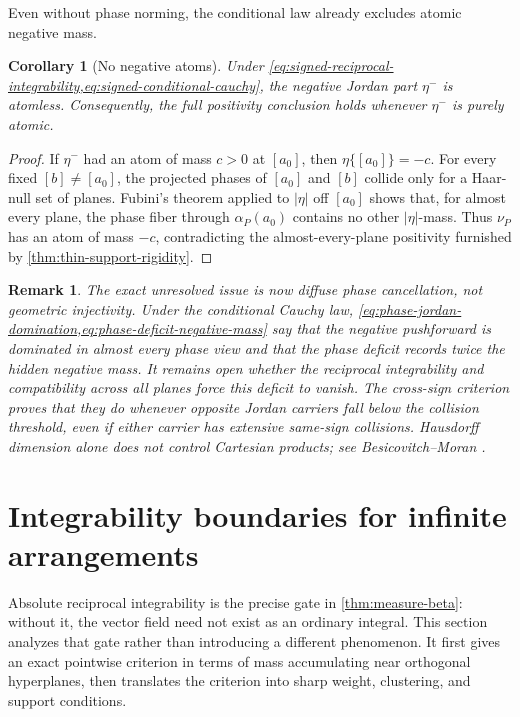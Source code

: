 \documentclass[11pt]{article}
\numberwithin{equation}{section}
\theoremstyle{thmstyleone}%
\newtheorem{corollary}[corollary]{Corollary}
\theoremstyle{thmstyletwo}%
\newtheorem*{remark}{Remark}%
\let\cref\autoref
\begin{document}
Even without phase norming, the conditional law already excludes atomic
negative mass.

\begin{corollary}[No negative atoms]
\label{cor:no-negative-atoms}
Under \cref{eq:signed-reciprocal-integrability,eq:signed-conditional-cauchy},
the negative Jordan part \(\eta^-\) is atomless.  Consequently, the full
positivity conclusion holds whenever \(\eta^-\) is purely atomic.
\end{corollary}

\begin{proof}
If \(\eta^-\) had an atom of mass \(c>0\) at \([a_0]\), then
\(\eta\{[a_0]\}=-c\).  For every fixed \([b]\neq[a_0]\), the projected
phases of \([a_0]\) and \([b]\) collide only for a Haar-null set of
planes.  Fubini's theorem applied to
\(|\eta|\) off \([a_0]\) shows that, for almost every plane, the phase
fiber through \(\alpha_P(a_0)\) contains no other \(|\eta|\)-mass.  Thus
\(\nu_P\) has an atom of mass \(-c\), contradicting the almost-every-plane
positivity furnished by \cref{thm:thin-support-rigidity}.
\end{proof}

\begin{remark}
The exact unresolved issue is now diffuse phase cancellation, not geometric
injectivity.  Under the conditional Cauchy law,
\cref{eq:phase-jordan-domination,eq:phase-deficit-negative-mass} say that
the negative pushforward is dominated in almost every phase view and that
the phase deficit records
twice the hidden negative mass.  It remains open whether the reciprocal
integrability and compatibility across all planes force this deficit to
vanish.  The cross-sign criterion proves that they do whenever opposite
Jordan carriers fall below the collision threshold, even if either carrier
has extensive same-sign collisions.  Hausdorff dimension alone does not
control Cartesian products; see Besicovitch--Moran
\cite{besicovitch-moran-1945}.
\end{remark}

\section{Integrability boundaries for infinite arrangements}
\label{sec:countable-boundary}

Absolute reciprocal integrability is the precise gate in
\cref{thm:measure-beta}: without it, the vector field need not exist as an
ordinary integral.  This section analyzes that gate rather than introducing a
different phenomenon.  It first gives an exact pointwise criterion in terms of
mass accumulating near orthogonal hyperplanes, then translates the criterion
into sharp weight, clustering, and support conditions.
\end{document}
